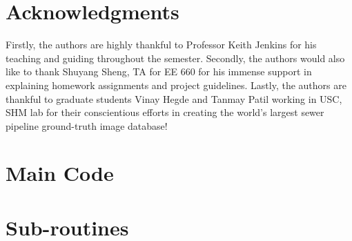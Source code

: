\documentclass[letterpaper,12pt, onecolumn]{article}%
\begin{document}
\section{Acknowledgments} 
\noindent
Firstly, the authors are highly thankful to Professor Keith Jenkins for his teaching and guiding throughout the semester. Secondly, the authors would also like to thank Shuyang Sheng, TA for EE 660 for his immense support in explaining homework assignments and project guidelines. Lastly, the authors are thankful to graduate students Vinay Hegde and Tanmay Patil working in USC, SHM lab for their conscientious efforts in creating the world's largest sewer pipeline ground-truth image database!

\clearpage	




\clearpage
\begin{appendices}
\section{Main Code}




\section{Sub-routines}













\end{appendices}


\end{document}
